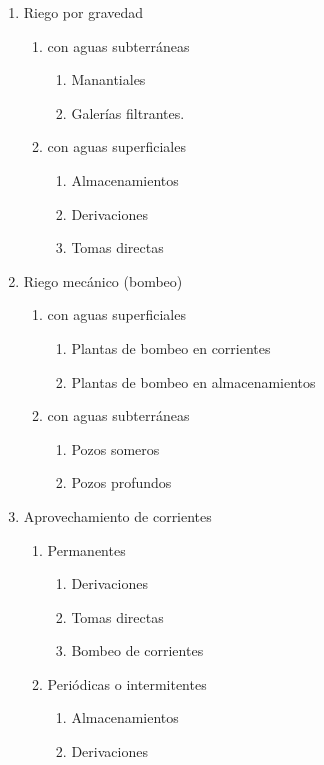 \begin{enumerate}
	\item Riego por gravedad
	      \begin{enumerate}
		      \item con aguas subterráneas
		            \begin{enumerate}
			            \item Manantiales
			            \item Galerías filtrantes.
		            \end{enumerate}
		      \item con aguas superficiales
		            \begin{enumerate}
			            \item Almacenamientos
			            \item Derivaciones
			            \item Tomas directas
		            \end{enumerate}
	      \end{enumerate}

	\item Riego mecánico (bombeo)
	      \begin{enumerate}
		      \item con aguas superficiales
		            \begin{enumerate}
			            \item Plantas de bombeo en corrientes
			            \item Plantas de bombeo en almacenamientos
		            \end{enumerate}
		      \item con aguas subterráneas
		            \begin{enumerate}
			            \item Pozos someros
			            \item Pozos profundos
		            \end{enumerate}
	      \end{enumerate}
	\item Aprovechamiento de corrientes
	      \begin{enumerate}
		      \item Permanentes
		            \begin{enumerate}
			            \item Derivaciones
			            \item Tomas directas
			            \item Bombeo de corrientes
		            \end{enumerate}
		      \item Periódicas o intermitentes
		            \begin{enumerate}
			            \item Almacenamientos
			            \item Derivaciones
		            \end{enumerate}
	      \end{enumerate}
\end{enumerate}

